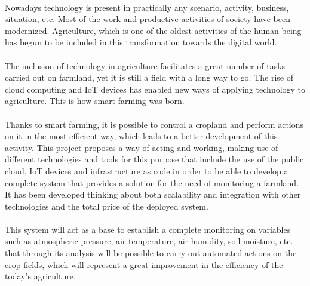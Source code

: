 \documentclass[../../memoria.tex]{subfiles}
\begin{document}
\paragraph{}
Nowadays technology is present in practically any scenario, activity, business, situation, etc. Most of the work and productive activities of society have been modernized. Agriculture, which is one of the oldest activities of the human being has begun to be included in this transformation towards the digital world.

\paragraph{}
The inclusion of technology in agriculture facilitates a great number of tasks carried out on farmland, yet it is still a field with a long way to go. The rise of cloud computing and IoT devices has enabled new ways of applying technology to agriculture. This is how smart farming was born.

\paragraph{}
Thanks to smart farming, it is possible to control a cropland and perform actions on it in the most efficient way, which leads to a better development of this activity. This project proposes a way of acting and working, making use of different technologies and tools for this purpose that include the use of the public cloud, IoT devices and infrastructure as code in order to be able to develop a complete system that provides a solution for the need of monitoring a farmland. It has been developed thinking about both scalability and integration with other technologies and the total price of the deployed system.

\paragraph{}
This system will act as a base to establish a complete monitoring on variables such as atmospheric pressure, air temperature, air humidity, soil moisture, etc. that through its analysis will be possible to carry out automated actions on the crop fields, which will represent a great improvement in the efficiency of the today's agriculture.
\end{document}
